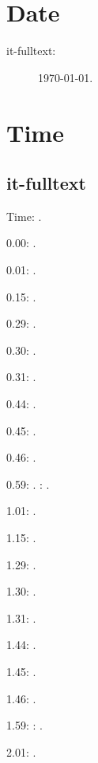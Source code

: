 \documentclass[italian]{article}
\begin{document}
\section{Date}

\begin{description}
\item[it-fulltext:]
\today.
\end{description}

\section{Time}
\subsection{it-fulltext}
Time: \DTMcurrenttime.

0.00:  .

0.01:   . 

0.15:   . 

0.29:   . 

0.30:   .

0.31:   .

0.44:   .

0.45:   .

0.46:   .

0.59:   .
:  .

1.01:   . 

1.15:   . 

1.29:   . 

1.30:   .

1.31:   .

1.44:   .

1.45:   .

1.46:   .

1.59:   
:  .

2.01:   . 
\end{document}
